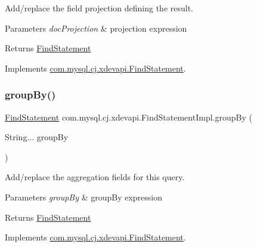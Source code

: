 Add/replace the field projection defining the result.


\begin{DoxyParams}{Parameters}
{\em doc\+Projection} & projection expression \\
\hline
\end{DoxyParams}
\begin{DoxyReturn}{Returns}
\mbox{\hyperlink{interfacecom_1_1mysql_1_1cj_1_1xdevapi_1_1_find_statement}{Find\+Statement}} 
\end{DoxyReturn}


Implements \mbox{\hyperlink{interfacecom_1_1mysql_1_1cj_1_1xdevapi_1_1_find_statement_ad4cbafb2eb15a77355ddcacf12188ba2}{com.\+mysql.\+cj.\+xdevapi.\+Find\+Statement}}.

\mbox{\label{classcom_1_1mysql_1_1cj_1_1xdevapi_1_1_find_statement_impl_ad75d9465a8dec5c2340ab8b25678f97d}} 
\subsubsection{\texorpdfstring{group\+By()}{groupBy()}}
{\footnotesize\ttfamily \mbox{\hyperlink{interfacecom_1_1mysql_1_1cj_1_1xdevapi_1_1_find_statement}{Find\+Statement}} com.\+mysql.\+cj.\+xdevapi.\+Find\+Statement\+Impl.\+group\+By (\begin{DoxyParamCaption}\item[{String...}]{group\+By }\end{DoxyParamCaption})}

Add/replace the aggregation fields for this query.


\begin{DoxyParams}{Parameters}
{\em group\+By} & group\+By expression \\
\hline
\end{DoxyParams}
\begin{DoxyReturn}{Returns}
\mbox{\hyperlink{interfacecom_1_1mysql_1_1cj_1_1xdevapi_1_1_find_statement}{Find\+Statement}} 
\end{DoxyReturn}


Implements \mbox{\hyperlink{interfacecom_1_1mysql_1_1cj_1_1xdevapi_1_1_find_statement_a05535b09958e5196723d4eb8911f0360}{com.\+mysql.\+cj.\+xdevapi.\+Find\+Statement}}.

